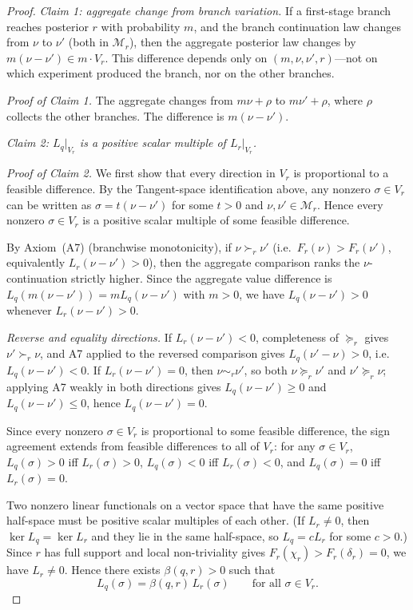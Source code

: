 \documentclass[11pt,a4paper]{article}
\theoremstyle{definition}
\newcommand{\1}{\mathbf 1}
\begin{document}
\begin{proof}
\emph{Claim 1: aggregate change from branch variation.}  If a first-stage branch reaches posterior $r$ with probability
$m$, and the branch continuation law changes from $\nu$ to $\nu'$ (both in $\mathcal M_r$), then the aggregate posterior
law changes by $m(\nu-\nu')\in m\cdot V_r$.  This difference depends only on $(m,\nu,\nu',r)$---not on which experiment
produced the branch, nor on the other branches.

\emph{Proof of Claim 1.}  The aggregate changes from $m\nu+\rho$ to $m\nu'+\rho$, where $\rho$ collects the other
branches.  The difference is $m(\nu-\nu')$.

\emph{Claim 2: $L_q|_{V_r}$ is a positive scalar multiple of $L_r|_{V_r}$.}

\emph{Proof of Claim 2.}  We first show that every direction in $V_r$ is proportional to a feasible difference.
By the Tangent-space identification above, any nonzero $\sigma\in V_r$ can be written as
$\sigma=t(\nu-\nu')$ for some $t>0$ and $\nu,\nu'\in\mathcal M_r$.  Hence every nonzero $\sigma\in V_r$ is a positive
scalar multiple of some feasible difference.

By Axiom~\textup{(A7)} (branchwise monotonicity), if $\nu\succ_r\nu'$ (i.e.\ $F_r(\nu)>F_r(\nu')$, equivalently
$L_r(\nu-\nu')>0$), then the aggregate comparison ranks the $\nu$-continuation strictly higher.  Since the aggregate
value difference is $L_q(m(\nu-\nu'))=mL_q(\nu-\nu')$ with $m>0$, we have $L_q(\nu-\nu')>0$ whenever $L_r(\nu-\nu')>0$.

\emph{Reverse and equality directions.}  If $L_r(\nu-\nu')<0$, completeness of $\succeq_r$ gives $\nu'\succ_r\nu$, and
A7 applied to the reversed comparison gives $L_q(\nu'-\nu)>0$, i.e.\ $L_q(\nu-\nu')<0$.  If $L_r(\nu-\nu')=0$, then
$\nu\sim_r\nu'$, so both $\nu\succeq_r\nu'$ and $\nu'\succeq_r\nu$; applying A7 weakly in both directions gives
$L_q(\nu-\nu')\ge 0$ and $L_q(\nu-\nu')\le 0$, hence $L_q(\nu-\nu')=0$.

Since every nonzero $\sigma\in V_r$ is proportional to some feasible difference, the sign agreement extends from
feasible differences to all of $V_r$: for any $\sigma\in V_r$, $L_q(\sigma)>0$ iff $L_r(\sigma)>0$, $L_q(\sigma)<0$
iff $L_r(\sigma)<0$, and $L_q(\sigma)=0$ iff $L_r(\sigma)=0$.

Two nonzero linear functionals on a vector space that have the same positive half-space must be positive scalar
multiples of each other.  (If $L_r\ne 0$, then $\ker L_q=\ker L_r$ and they lie in the same half-space, so $L_q=cL_r$
for some $c>0$.)  Since $r$ has full support and local non-triviality gives $F_r(\chi_r)>F_r(\delta_r)=0$, we have
$L_r\ne 0$.  Hence there exists $\beta(q,r)>0$ such that
\[
L_q(\sigma)=\beta(q,r)\,L_r(\sigma)
\qquad\text{for all }\sigma\in V_r.
\]


\end{proof}
\end{document}
